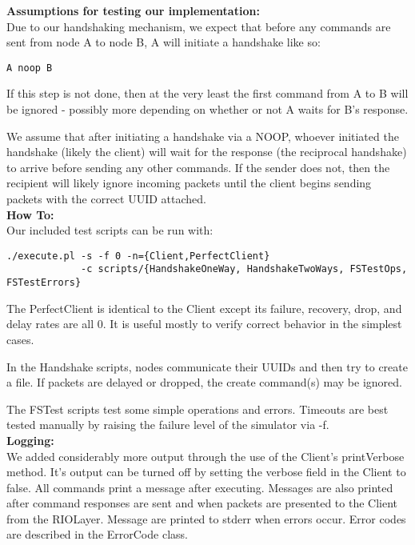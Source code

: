 \documentclass[11pt]{article}
\begin{document}
\textbf{Assumptions for testing our implementation:} \\

Due to our handshaking mechanism, we expect that before any commands are sent from node A to node B, A will initiate a handshake like so:

\begin{verbatim}
A noop B
\end{verbatim}

If this step is not done, then at the very least the first command from A to B will be ignored - possibly more depending on whether or not A waits for B's response.

We assume that after initiating a handshake via a NOOP, whoever initiated the handshake (likely the client) will wait for the response (the reciprocal handshake) to arrive before sending any other commands. If the sender does not, then the recipient will likely ignore incoming packets until the client begins sending packets with the correct UUID attached. \\

\textbf{How To:} \\

Our included test scripts can be run with:

\begin{verbatim}
./execute.pl -s -f 0 -n={Client,PerfectClient} 
             -c scripts/{HandshakeOneWay, HandshakeTwoWays, FSTestOps, FSTestErrors}
\end{verbatim}

The PerfectClient is identical to the Client except its failure, recovery, drop, and delay rates are all 0. It is useful mostly to verify correct behavior in the simplest cases.

In the Handshake scripts, nodes communicate their UUIDs and then try to create a file. If packets are delayed or dropped, the create command(s) may be ignored.

The FSTest scripts test some simple operations and errors. Timeouts are best tested manually by raising the failure level of the simulator via -f. \\

\textbf{Logging:} \\

We added considerably more output through the use of the Client's printVerbose method. It's output can be turned off by setting the verbose field in the Client to false. All commands print a message after executing. Messages are also printed after command responses are sent and when packets are presented to the Client from the RIOLayer. Message are printed to stderr when errors occur. Error codes are described in the ErrorCode class.
\end{document}
